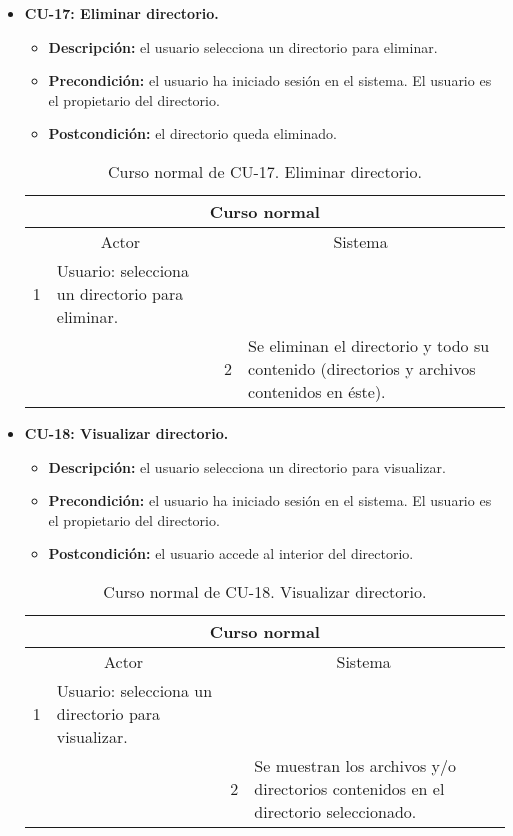 \begin{itemize}
	\item \textbf{CU-17: Eliminar directorio.}
	\begin{itemize}
		\item \textbf{Descripción:} el usuario selecciona un directorio para eliminar.
		\item \textbf{Precondición:} el usuario ha iniciado sesión en el sistema. El usuario es el propietario del directorio.
		\item \textbf{Postcondición:} el directorio queda eliminado.
	\end{itemize}
	\begin{table}[H]
		\centering
		\begin{tabular}{|p{0.3cm}|p{5cm}|p{0.3cm}|p{5cm}|}
			\hline
			\multicolumn{4}{|c|}{Curso normal} \\ \hline
			\multicolumn{2}{|c|}{Actor} & \multicolumn{2}{|c|}{Sistema} \\ \hline
			1 & Usuario: selecciona un directorio para eliminar. &  &  \\ \hline
			&  & 2 & Se eliminan el directorio y todo su contenido (directorios y archivos contenidos en éste). \\ \hline
		\end{tabular}
		\caption{Curso normal de CU-17. Eliminar directorio.}
		\label{tabla:cu17-normal}
	\end{table}
\end{itemize}

\begin{itemize}
	\item \textbf{CU-18: Visualizar directorio.}
	\begin{itemize}
		\item \textbf{Descripción:} el usuario selecciona un directorio para visualizar.
		\item \textbf{Precondición:} el usuario ha iniciado sesión en el sistema. El usuario es el propietario del directorio.
		\item \textbf{Postcondición:} el usuario accede al interior del directorio.
	\end{itemize}
	\begin{table}[H]
		\centering
		\begin{tabular}{|p{0.3cm}|p{5cm}|p{0.3cm}|p{5cm}|}
			\hline
			\multicolumn{4}{|c|}{Curso normal} \\ \hline
			\multicolumn{2}{|c|}{Actor} & \multicolumn{2}{|c|}{Sistema} \\ \hline
			1 & Usuario: selecciona un directorio para visualizar. &  &  \\ \hline
			&  & 2 & Se muestran los archivos y/o directorios contenidos en el directorio seleccionado. \\ \hline
		\end{tabular}
		\caption{Curso normal de CU-18. Visualizar directorio.}
		\label{tabla:cu18-normal}
	\end{table}
\end{itemize}

